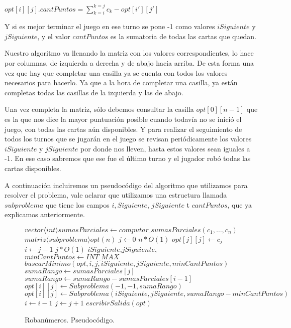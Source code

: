 $opt[i][j].cantPuntos = \sum_{k=i}^{k=j} c_k - opt[i'][j']$

Y si es mejor terminar el juego en ese turno se pone -1 como valores $iSiguiente$ y $jSiguiente$, y el valor $cantPuntos$ es la sumatoria de todas las cartas que quedan.

Nuestro algoritmo va llenando la matriz con los valores correspondientes, lo hace por columnas, de izquierda a derecha y de abajo hacia arriba. De esta forma una vez que hay que completar una casilla ya se cuenta con todos los valores necesarios para hacerlo. Ya que a la hora de completar una casilla, ya están completas todas las casillas de la izquierda y las de abajo. 

Una vez completa la matriz, sólo debemos consultar la casilla $opt[0][n-1]$ que es la que nos dice la mayor puntuación posible cuando todavía no se inició el juego, con todas las cartas aún disponibles. Y para realizar el seguimiento de todos los turnos que se jugarán en el juego se revisan periódicamente los valores $iSiguiente$ y $jSiguiente$ por donde nos lleven, hasta estos valores sean iguales a -1. En ese caso sabremos que ese fue el último turno y el jugador robó todas las cartas disponibles.

A continuación incluiremos un pseudocódigo del algoritmo que utilizamos para resolver el problema, vale aclarar que utilizamos una estructura llamada $subproblema$ que tiene los campos $i,Siguiente$, $jSiguiente$ t $cantPuntos$, que ya explicamos anteriormente. 

\begin{center}
\begin{figure}[H]
    \begin{pseudo}
            \State $vector\langle int \rangle sumasParciales \leftarrow computar\_sumasParciales(c_1, \ldots, c_n)$ 
            \State $matriz\langle subproblema \rangle opt(n)$ 
            \State $j \leftarrow 0$ 
             \hfill $n*O(1)$
                \State $opt[j][j] \leftarrow c_j$
                \State $i \leftarrow j-1$
                 \hfill $j*O(1)$
                    \State $iSiguiente$,$jSiguiente$, $minCantPuntos \leftarrow INT\_MAX$ 
		    \State $buscarMinimo(opt,i,j,iSiguiente,jSiguiente,minCantPuntos)$ 
		    \State $sumaRango \leftarrow sumasParciales[j]$ 
		     
			\State $sumaRango \leftarrow sumaRango - sumasParciales[i-1]$ 
		    \EndIf
		     
			\State $opt[i][j] \leftarrow Subproblema(-1,-1,sumaRango)$ 
		    \Else
			\State $opt[i][j] \leftarrow Subproblema(iSiguiente,jSiguiente, sumaRango - minCantPuntos)$ 
		    \EndIf
		    \State $i \leftarrow i-1$
		 \EndWhile
		 \State $j \leftarrow j+1$
            \EndWhile
            \State $escribirSalida(opt)$ 
        \EndProcedure
    \end{pseudo}
    \caption{Robanúmeros. Pseudocódigo.}
    \label{problema1-pseudo}
\end{figure}
\end{center}